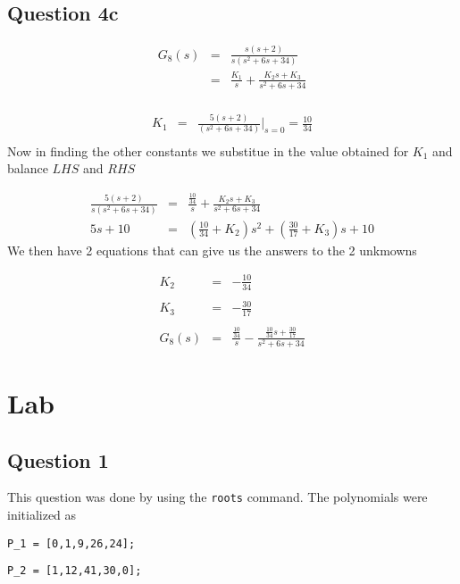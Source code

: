 \documentclass[12pt, a4paper]{article}
\begin{document}
	\subsection*{Question 4c}
	\label{sub:question_4c}
		\begin{equation}
			\begin{array}{rcl}
				G_8 (s) & = & \frac{s(s+2)}{s(s^2+6s+34)} \\
				& = & \frac{K_1}{s}+\frac{K_2s + K_3}{s^2+6s+34}\\ 
			\end{array}
		\end{equation}

		\begin{equation}
			\begin{array}{rcl}
				K_1  & = & \frac{5(s+2)}{(s^2+6s+34)}\bigg\rvert_{s=0} = \frac{10}{34}
				\\ 
			\end{array}
		\end{equation}
		Now in finding the other constants we substitue in the value obtained for $K_1$ and balance $LHS$ and $RHS$

		\begin{equation}
			\begin{array}{rcl}
				\frac{5(s+2)}{s(s^2+6s+34)}  & = & \frac{\frac{10}{34}}{s} + \frac{K_2s+K_3}{s^2+6s+34}\\
				5s+10 & = & (\frac{10}{34}+K_2)s^2 + (\frac{30}{17}+K_3)s +10 
			\end{array}
		\end{equation}
		We then have 2 equations that can give us the answers to the 2 unkmowns 

		\begin{equation}
			\begin{array}{rcl}
				K_2 & = & - \frac{10}{34}\\
				\\
				K_3 & = & - \frac{30}{17}\\
				\\
				G_8(s) & = & \frac{\frac{10}{34}}{s} - \frac{\frac{10}{34}s+\frac{30}{17}}{s^2+6s+34}
			\end{array}
		\end{equation}



	\section{Lab} %
	\label{sec:lab}
		\subsection*{Question 1} %
		\label{sub:question}
			This question was done by using the \texttt{roots} command. The polynomials were initialized as \par
			\texttt{P\_1 = [0,1,9,26,24];} \par
			\texttt{P\_2 = [1,12,41,30,0];}
\end{document}
